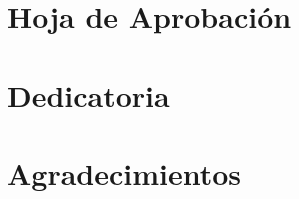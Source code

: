 \documentclass[11pt, sfdefaults=false, spanish]{scrreprt}
\begin{document}


\chapter*{Hoja de Aprobación}
\chapter*{Dedicatoria}
\chapter*{Agradecimientos}



\tableofcontents
\listoftables
\listoffigures













\printbibliography

\clearpage


\end{document}
